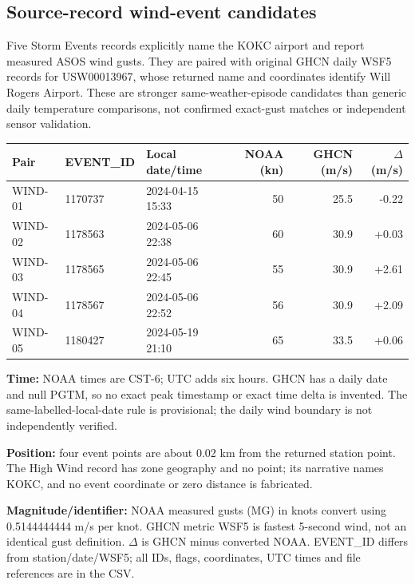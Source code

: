 \subsection{Source-record wind-event candidates}

Five Storm Events records explicitly name the KOKC airport and report measured ASOS wind gusts. They are paired with original GHCN daily WSF5 records for USW00013967, whose returned name and coordinates identify Will Rogers Airport. These are stronger same-weather-episode candidates than generic daily temperature comparisons, not confirmed exact-gust matches or independent sensor validation.

\begin{longtable}{llL{2.4cm}rrr}

\toprule Pair & EVENT\_ID & Local date/time & NOAA (kn) & GHCN (m/s) & $\Delta$ (m/s) \\ \midrule\endhead

WIND-01 & 1170737 & 2024-04-15 15:33 & 50 & 25.5 & -0.22 \\

WIND-02 & 1178563 & 2024-05-06 22:38 & 60 & 30.9 & +0.03 \\

WIND-03 & 1178565 & 2024-05-06 22:45 & 55 & 30.9 & +2.61 \\

WIND-04 & 1178567 & 2024-05-06 22:52 & 56 & 30.9 & +2.09 \\

WIND-05 & 1180427 & 2024-05-19 21:10 & 65 & 33.5 & +0.06 \\

\bottomrule\end{longtable}

\textbf{Time:} NOAA times are CST-6; UTC adds six hours. GHCN has a daily date and null PGTM, so no exact peak timestamp or exact time delta is invented. The same-labelled-local-date rule is provisional; the daily wind boundary is not independently verified.

\textbf{Position:} four event points are about 0.02 km from the returned station point. The High Wind record has zone geography and no point; its narrative names KOKC, and no event coordinate or zero distance is fabricated.

\textbf{Magnitude/identifier:} NOAA measured gusts (MG) in knots convert using 0.5144444444 m/s per knot. GHCN metric WSF5 is fastest 5-second wind, not an identical gust definition. $\Delta$ is GHCN minus converted NOAA. EVENT\_ID differs from station/date/WSF5; all IDs, flags, coordinates, UTC times and file references are in the CSV.

